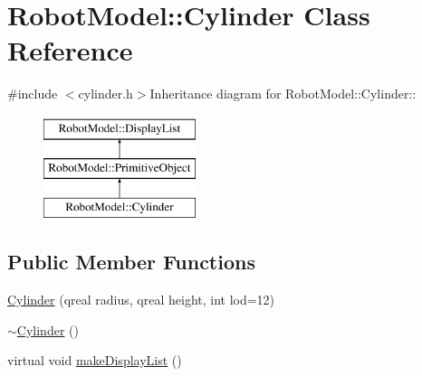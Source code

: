 \hypertarget{class_robot_model_1_1_cylinder}{
\section{RobotModel::Cylinder Class Reference}
\label{class_robot_model_1_1_cylinder}
}


{\ttfamily \#include $<$cylinder.h$>$}Inheritance diagram for RobotModel::Cylinder::\begin{figure}[H]
\begin{center}
\leavevmode
\includegraphics[height=3cm]{class_robot_model_1_1_cylinder}
\end{center}
\end{figure}
\subsection*{Public Member Functions}
\begin{DoxyCompactItemize}
\item 
\hyperlink{class_robot_model_1_1_cylinder_aa738cca8df1e6a449662f33a814e67f8}{Cylinder} (qreal radius, qreal height, int lod=12)
\item 
\hyperlink{class_robot_model_1_1_cylinder_a05ab556f0ae3cd6e99d9d1f3caca80b3}{$\sim$Cylinder} ()
\item 
virtual void \hyperlink{class_robot_model_1_1_cylinder_a9f0361117d5f20344f543c9e20df1113}{makeDisplayList} ()
\end{DoxyCompactItemize}


